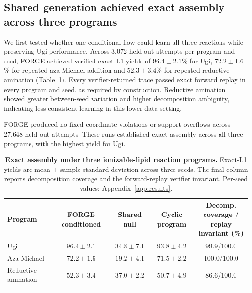 \documentclass{article}
\theoremstyle{definition}
\newcommand{\ForgeTableOneConditionedBLYield}{$72.2\pm1.6$}
\newcommand{\ForgeTableOneConditionedLXYield}{$52.3\pm3.4$}
\newcommand{\ForgeTableOneConditionedUgiYield}{$96.4\pm2.1$}
\newcommand{\ForgeProseAttemptsPerProgram}{3{,}072}
\newcommand{\ForgeProseConditionedTotalAttempts}{27{,}648}
\begin{document}
\subsection{Shared generation achieved exact assembly across three programs}
We first tested whether one conditional flow could learn all three reactions while preserving Ugi
performance. Across
\ForgeProseAttemptsPerProgram{} held-out attempts per program and seed, FORGE achieved verified
exact-L1 yields of \ForgeTableOneConditionedUgiYield\% for Ugi,
\ForgeTableOneConditionedBLYield\% for repeated aza-Michael addition and
\ForgeTableOneConditionedLXYield\% for repeated reductive amination
(Table~\ref{tab:iclr-shared-programs}). Every verifier-returned trace passed exact forward replay in
every program and seed, as required by construction. Reductive amination showed greater between-seed
variation and higher decomposition ambiguity, indicating less consistent learning in this lower-data
setting.

FORGE produced no fixed-coordinate violations or support overflows across
\ForgeProseConditionedTotalAttempts{} held-out attempts. These runs established exact assembly across
all three programs, with the highest yield for Ugi.

\begin{table}[H]
\caption{\textbf{Exact assembly under three ionizable-lipid reaction programs.}
Exact-L1 yields are mean $\pm$ sample standard deviation across three seeds. The final column reports
decomposition coverage and the forward-replay verifier invariant. Per-seed values:
Appendix~\ref{app:results}.}
\label{tab:iclr-shared-programs}
\centering
\small
\setlength{\tabcolsep}{4.6pt}
\begin{tabular}{@{}lcccc@{}}
\toprule
Program & FORGE conditioned & Shared null & Cyclic program &
\shortstack{Decomp. coverage /\\ replay invariant (\%)} \\
\midrule
Ugi & $96.4\pm2.1$ & $34.8\pm7.1$ & $93.8\pm4.2$ & 99.9/100.0 \\
Aza-Michael & $72.2\pm1.6$ & $19.2\pm4.1$ & $71.5\pm2.2$ & 100.0/100.0 \\
Reductive amination & $52.3\pm3.4$ & $37.0\pm2.2$ & $50.7\pm4.9$ & 86.6/100.0 \\
\relax{}\end{tabular}
\end{table}
\end{document}
